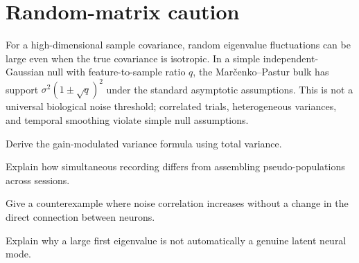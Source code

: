 \section{Random-matrix caution}
For a high-dimensional sample covariance, random eigenvalue fluctuations can be large even when the true covariance is isotropic. In a simple independent-Gaussian null with feature-to-sample ratio $q$, the Mar\v{c}enko--Pastur bulk has support $\sigma^2(1\pm\sqrt q)^2$ under the standard asymptotic assumptions. This is not a universal biological noise threshold; correlated trials, heterogeneous variances, and temporal smoothing violate simple null assumptions.

\begin{exercises}
\item Derive the gain-modulated variance formula using total variance.
\item Explain how simultaneous recording differs from assembling pseudo-populations across sessions.
\item Give a counterexample where noise correlation increases without a change in the direct connection between neurons.
\item Explain why a large first eigenvalue is not automatically a genuine latent neural mode.
\end{exercises}
